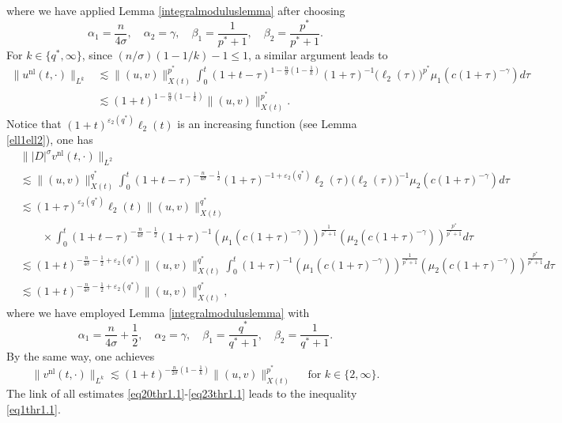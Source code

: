 \documentclass[11pt,reqno]{amsart}
\newcommand{\tron}[1]{\left( #1 \right)}
\numberwithin{equation}{section}
\begin{document}
where we have applied Lemma \ref{integralmoduluslemma} after choosing
\[
\alpha_1=\frac{n}{4\sigma},\quad \alpha_2=\gamma,\quad \beta_1=\frac{1}{p^*+1},\quad  \beta_2=\frac{p^*}{p^*+1}.
\]
For $k\in \{q^*,\infty\}$, since $(n/\sigma)\tron{1-1/k}-1\leq 1$, a similar argument leads to
\begin{align}
\big\|u^{\mathrm{nl}}(t, \cdot)\big\|_{L^k}&\lesssim\|(u, v)\|_{X(t)}^{p^*} \int_0^t(1+t-\tau)^{1-\frac{n}{\sigma}\tron{1-\frac{1}{k}}}(1+\tau)^{-1}\big(\ell_2(\tau)\big)^{p^*}\mu_1\left(c(1+\tau)^{-\gamma}\right) d \tau\nonumber\\
&\lesssim(1+t)^{1-\frac{n}{\sigma}\tron{1-\frac{1}{k}}}\|(u, v)\|_{X(t)}^{p^*}.\label{eq21thr1.1}
\end{align}
Notice that $(1+t)^{\varepsilon_2(q^*)}\ell_2(t)$ is an increasing function (see Lemma \ref{ell1ell2}), one has 
\begin{align}
&\big\||D|^{\sigma}v^{\mathrm{nl}}(t, \cdot)\big\|_{L^2}\nonumber\\
&\lesssim\|(u, v)\|_{X(t)}^{q^*} \int_0^t(1+t-\tau)^{-\frac{n}{4\sigma}-\frac{1}{2}}(1+\tau)^{-1+\varepsilon_2(q^*)}\ell_2(\tau)\big(\ell_2(\tau)\big)^{-1}\mu_2\left(c(1+\tau)^{-\gamma}\right) d\tau \nonumber\\
& \lesssim(1+\tau)^{\varepsilon_2(q^*)}\ell_2(t)\|(u, v)\|_{X(t)}^{q^*}\nonumber\\
&\quad \quad \times \int_0^t(1+t-\tau)^{-\frac{n}{4\sigma}-\frac{1}{2}}(1+\tau)^{-1}\left(\mu_1\left(c(1+\tau)^{-\gamma}\right)\right)^{\frac{1}{p^*+1}}\left(\mu_2\left(c(1+\tau)^{-\gamma}\right)\right)^{\frac{p^*}{p^*+1}} d \tau\nonumber\\
&\lesssim(1+t)^{-\frac{n}{4\sigma}-\frac{1}{2}+\varepsilon_2(q^*)}\|(u, v)\|_{X(t)}^{q^*}\int_0^t(1+\tau)^{-1}\left(\mu_1\left(c(1+\tau)^{-\gamma}\right)\right)^{\frac{1}{p^*+1}}\left(\mu_2\left(c(1+\tau)^{-\gamma}\right)\right)^{\frac{p^*}{p^*+1}} d \tau\nonumber\\
&\lesssim(1+t)^{-\frac{n}{4\sigma}-\frac{1}{2}+\varepsilon_2(q^*)}\|(u, v)\|_{X(t)}^{q^*},\label{eq22thr1.1}
\end{align}
where we have employed Lemma \ref{integralmoduluslemma} with
$$
\alpha_1=\frac{n}{4\sigma}+\frac{1}{2},\quad \alpha_2=\gamma,\quad \beta_1=\frac{q^*}{q^*+1},\quad \beta_2=\frac{1}{q^*+1}.
$$
By the same way, one achieves 
\begin{equation}\label{eq23thr1.1}
\big\|v^{\mathrm{nl}}(t,\cdot)\big\|_{L^k}\lesssim (1+t)^{-\frac{n}{2\sigma}\tron{1-\frac{1}{k}}}\|(u,v)\|^{p^*}_{X(t)}\quad\text{ for }k\in\{2,\infty\}.
\end{equation}
The link of all estimates \eqref{eq20thr1.1}-\eqref{eq23thr1.1} leads to the inequality \eqref{eq1thr1.1}. \medskip
\end{document}
